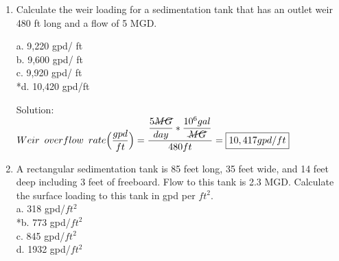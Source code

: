 \documentclass{article}
\begin{document}
\begin{enumerate}
\item Calculate the weir loading for a sedimentation tank that has an outlet weir 480 ft long and a flow of 5 MGD.\\

\vspace{0.5cm}

a. 9,220 gpd/ ft \\
b. 9,600 gpd/ ft \\
c. 9,920 gpd/ ft \\
*d. 10,420 gpd/ft \\

\vspace{0.5cm}

Solution:\\
$Weir \enspace overflow \enspace rate \Big(\dfrac{gpd}{ft}\Big) =\dfrac{\dfrac{5\cancel{MG}}{{day}}*\dfrac{10^6gal}{\cancel{MG}}}{480 ft}=\boxed{10,417gpd/ft}$\\ 

\item A rectangular sedimentation tank is 85 feet long, 35 feet wide, and 14 feet deep including 3 feet of freeboard. Flow to this tank is 2.3 MGD. Calculate the surface loading to this tank in gpd per $ft^2$. \\

a. 318 gpd/$ft^2$ \\
*b. 773 gpd/$ft^2$ \\
c. 845 gpd/$ft^2$ \\
d. 1932 gpd/$ft^2$ \\

\end{enumerate}
\end{document}
